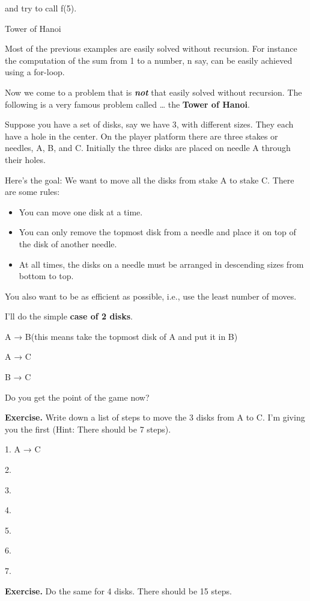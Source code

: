 \documentclass[
]{article}
\providecommand{\tightlist}{%
  \setlength{\itemsep}{0pt}\setlength{\parskip}{0pt}}
\begin{document}
and try to call f(5).

Tower of Hanoi

Most of the previous examples are easily solved without recursion. For
instance the computation of the sum from 1 to a number, n say, can be
easily achieved using a for-loop.

Now we come to a problem that is \emph{\textbf{not}} that easily solved
without recursion. The following is a very famous problem called
\ldots{} the \textbf{Tower of Hanoi}.

Suppose you have a set of disks, say we have 3, with different sizes.
They each have a hole in the center. On the player platform there are
three stakes or needles, A, B, and C. Initially the three disks are
placed on needle A through their holes.

Here's the goal: We want to move all the disks from stake A to stake C.
There are some rules:

\begin{itemize}
\tightlist
\item
  You can move one disk at a time.
\item
  You can only remove the topmost disk from a needle and place it on top
  of the disk of another needle.
\item
  At all times, the disks on a needle must be arranged in descending
  sizes from bottom to top.
\end{itemize}

You also want to be as efficient as possible, i.e., use the least number
of moves.

I'll do the simple \textbf{case of 2 disks}.

A → B(this means take the topmost disk of A and put it in B)

A → C

B → C

Do you get the point of the game now?

\textbf{Exercise.} Write down a list of steps to move the 3 disks from A
to C. I'm giving you the first (Hint: There should be 7 steps).

1. A \protect\hypertarget{anchor}{}{}→ C

2.

3.

4.

5.

6.

7.

\textbf{Exercise.} Do the same for 4 disks. There should be 15 steps.
\end{document}
